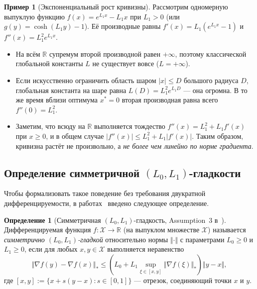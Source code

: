 \documentclass[11pt, a4paper]{article}
\theoremstyle{definition}
\newtheorem{definition}{Определение}[section]
\newtheorem{example}{Пример}[section]
\begin{document}
\begin{example}[Экспоненциальный рост кривизны]\label{ex:exp_cosh}
Рассмотрим одномерную выпуклую функцию $f(x) = e^{L_1 x} - L_1 x$ при $L_1 > 0$ (или $g(y) = \cosh(L_1 y) - 1$). Её производные равны $f'(x) = L_1(e^{L_1 x} - 1)$ и $f''(x) = L_1^2 e^{L_1 x}$.
\begin{itemize}
    \item На всём $\mathbb{R}$ супремум второй производной равен $+\infty$, поэтому классической глобальной константы $L$ не существует вовсе ($L = +\infty$).
    \item Если искусственно ограничить область шаром $|x| \le D$ большого радиуса $D$, глобальная константа на шаре равна $L(D) = L_1^2 e^{L_1 D}$ --- она огромна. В то же время вблизи оптимума $x^* = 0$ вторая производная равна всего $f''(0) = L_1^2$.
    \item Заметим, что всюду на $\mathbb{R}$ выполняется тождество $f''(x) = L_1^2 + L_1 f'(x)$ при $x \ge 0$, и в общем случае $|f''(x)| \le L_1^2 + L_1 |f'(x)|$. Таким образом, кривизна растёт не произвольно, а \emph{не более чем линейно по норме градиента}.
\end{itemize}
\end{example}

\subsection{Определение симметричной $(L_0, L_1)$-гладкости}

Чтобы формализовать такое поведение без требования двукратной дифференцируемости, в работах~\cite{Zhang2020, Gorbunov2024} введено следующее определение.

\begin{definition}[Симметричная $(L_0, L_1)$-гладкость, Assumption~3 в~\cite{Gorbunov2024}]\label{def:l0l1}
Дифференцируемая функция $f : \mathcal{X} \to \mathbb{R}$ (на выпуклом множестве $\mathcal{X}$) называется \emph{симметрично $(L_0, L_1)$-гладкой} относительно нормы $\Vert \cdot \Vert$ с параметрами $L_0 \ge 0$ и $L_1 \ge 0$, если для любых $x, y \in \mathcal{X}$ выполняется неравенство
\begin{equation}\label{eq:def_l0l1}
\Vert \nabla f(y) - \nabla f(x) \Vert_* \le \left(L_0 + L_1 \sup_{\xi \in [x, y]} \Vert \nabla f(\xi) \Vert_*\right) \Vert y - x \Vert,
\end{equation}
где $[x, y] := \{x + s(y - x) : s \in [0, 1]\}$ --- отрезок, соединяющий точки $x$ и $y$.
\end{definition}
\end{document}
